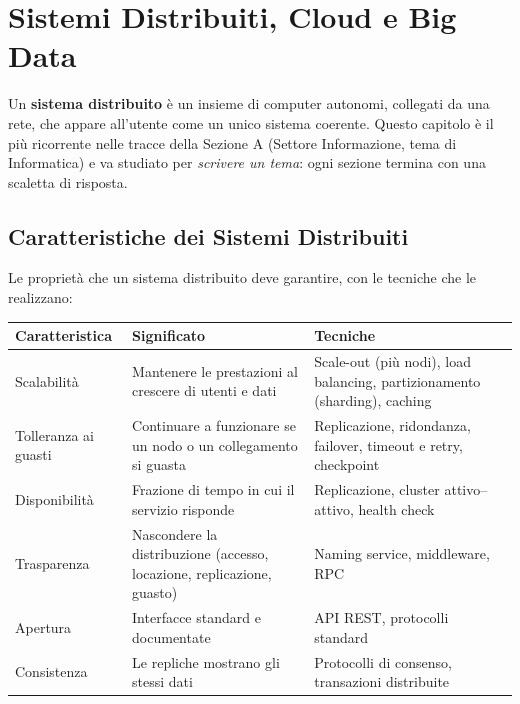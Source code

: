 \chapter{Sistemi Distribuiti, Cloud e Big Data}

Un \textbf{sistema distribuito} è un insieme di computer autonomi, collegati da una rete, che appare all'utente come un unico sistema coerente. Questo capitolo è il più ricorrente nelle tracce della Sezione A (Settore Informazione, tema di Informatica) e va studiato per \emph{scrivere un tema}: ogni sezione termina con una scaletta di risposta.

\section{Caratteristiche dei Sistemi Distribuiti}
Le proprietà che un sistema distribuito deve garantire, con le tecniche che le realizzano:

\begin{center}
\begin{tabularx}{\textwidth}{@{}lXX@{}}
\toprule
\textbf{Caratteristica} & \textbf{Significato} & \textbf{Tecniche} \\
\midrule
Scalabilità & Mantenere le prestazioni al crescere di utenti e dati & Scale-out (più nodi), load balancing, partizionamento (sharding), caching \\
Tolleranza ai guasti & Continuare a funzionare se un nodo o un collegamento si guasta & Replicazione, ridondanza, failover, timeout e retry, checkpoint \\
Disponibilità & Frazione di tempo in cui il servizio risponde & Replicazione, cluster attivo--attivo, health check \\
Trasparenza & Nascondere la distribuzione (accesso, locazione, replicazione, guasto) & Naming service, middleware, RPC \\
Apertura & Interfacce standard e documentate & API REST, protocolli standard \\
Consistenza & Le repliche mostrano gli stessi dati & Protocolli di consenso, transazioni distribuite \\
\bottomrule
\end{tabularx}
\end{center}

